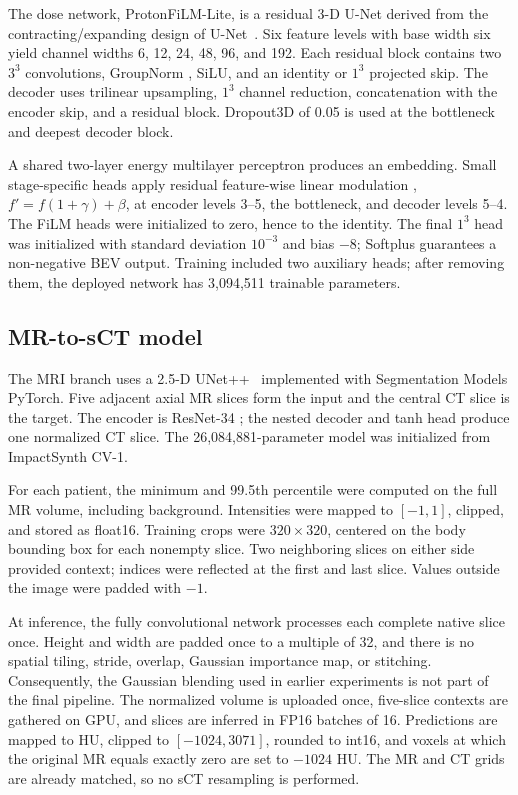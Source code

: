 \documentclass[runningheads]{llncs}
\newcommand{\methodname}{ProtonFiLM-Lite}
\begin{document}
The dose network, \methodname, is a residual 3-D U-Net derived from the
contracting/expanding design of U-Net~\cite{ronneberger2015unet}. Six feature
levels with base width six yield channel widths 6, 12, 24, 48, 96, and 192.
Each residual block contains two $3^3$ convolutions, GroupNorm
\cite{wu2018groupnorm}, SiLU, and an identity or $1^3$ projected skip. The
decoder uses trilinear upsampling, $1^3$ channel reduction, concatenation with
the encoder skip, and a residual block. Dropout3D of 0.05 is used at the
bottleneck and deepest decoder block.

A shared two-layer energy multilayer perceptron produces an embedding. Small
stage-specific heads apply residual feature-wise linear modulation
\cite{perez2018film}, $f'=f(1+\gamma)+\beta$, at encoder levels 3--5, the
bottleneck, and decoder levels
5--4. The FiLM heads were initialized to zero, hence to the identity. The final
$1^3$ head was initialized with standard deviation $10^{-3}$ and bias $-8$;
Softplus guarantees a non-negative BEV output. Training included two auxiliary
heads; after removing them, the deployed network has 3,094,511 trainable
parameters.

\subsection{MR-to-sCT model}

The MRI branch uses a 2.5-D UNet++~\cite{zhou2018unetplusplus} implemented with
Segmentation Models PyTorch. Five adjacent axial MR slices form the input and
the central CT slice is the target. The encoder is ResNet-34
\cite{he2016resnet}; the nested decoder and tanh head produce one normalized CT
slice. The 26,084,881-parameter model was initialized from ImpactSynth CV-1.

For each patient, the minimum and 99.5th percentile were computed on the full
MR volume, including background. Intensities were mapped to $[-1,1]$, clipped,
and stored as float16. Training crops were $320\times320$, centered on the body
bounding box for each nonempty slice. Two neighboring slices on either side
provided context; indices were reflected at the first and last slice. Values
outside the image were padded with $-1$.

At inference, the fully convolutional network processes each complete native
slice once. Height and width are padded once to a multiple of 32, and there is
no spatial tiling, stride, overlap, Gaussian importance map, or stitching.
Consequently, the Gaussian blending used in earlier experiments is not part of
the final pipeline. The normalized volume is uploaded once, five-slice
contexts are gathered on GPU, and slices are inferred in FP16 batches of 16.
Predictions are mapped to HU, clipped to $[-1024,3071]$, rounded to int16, and
voxels at which the original MR equals exactly zero are set to $-1024$ HU.
The MR and CT grids are already matched, so no sCT resampling is performed.
\end{document}
